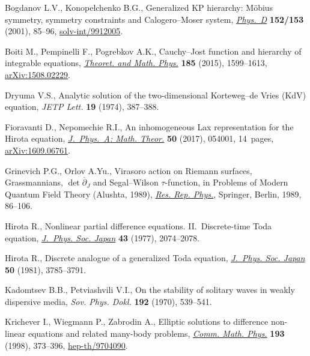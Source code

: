 \documentclass[pdftex]{sigma}
\numberwithin{equation}{section}
\begin{document}
\begin{thebibliography}{99}
\footnotesize\itemsep=-0.5pt

Bogdanov L.V., Konopelchenko B.G., Generalized {KP} hierarchy: {M}\"obius
 symmetry, symmetry constraints and {C}alogero--{M}oser system,
 \href{https://doi.org/10.1016/S0167-2789(01)00161-0}{\textit{Phys.~D}} \textbf{152/153} (2001), 85--96, \href{https://arxiv.org/abs/solv-int/9912005}{solv-int/9912005}.

Boiti M., Pempinelli F., Pogrebkov A.K., Cauchy--{J}ost function and hierarchy
 of integrable equations, \href{https://doi.org/10.1007/s11232-015-0367-y}{\textit{Theo\-ret. and Math. Phys.}} \textbf{185}
 (2015), 1599--1613, \href{https://arxiv.org/abs/1508.02229}{arXiv:1508.02229}.

Dryuma V.S., Analytic solution of the two-dimensional {K}orteweg--de {V}ries
 {(KdV)} equation, \textit{JETP Lett.} \textbf{19} (1974), 387--388.

Fioravanti D., Nepomechie R.I., An inhomogeneous {L}ax representation for the
 {H}irota equation, \href{https://doi.org/10.1088/1751-8121/aa5303}{\textit{J.~Phys.~A: Math. Theor.}} \textbf{50} (2017),
 054001, 14~pages, \href{https://arxiv.org/abs/1609.06761}{arXiv:1609.06761}.

Grinevich P.G., Orlov A.Yu., Virasoro action on {R}iemann surfaces,
 {G}rassmannians, {$\det \overline\partial_J$} and {S}egal--{W}ilson
 {$\tau$}-function, in Problems of Modern Quantum Field Theory ({A}lushta,
 1989), \href{https://doi.org/10.1007/978-3-642-84000-5_7}{\textit{Res. Rep. Phys.}}, Springer, Berlin, 1989, 86--106.

Hirota R., Nonlinear partial dif\/ference equations. {II}.~{D}iscrete-time {T}oda
 equation, \href{https://doi.org/10.1143/JPSJ.43.2074}{\textit{J.~Phys. Soc. Japan}} \textbf{43} (1977), 2074--2078.

Hirota R., Discrete analogue of a generalized {T}oda equation, \href{https://doi.org/10.1143/JPSJ.50.3785}{\textit{J.~Phys.
 Soc. Japan}} \textbf{50} (1981), 3785--3791.

Kadomtsev B.B., Petviashvili V.I., On the stability of solitary waves in weakly
 dispersive media, \textit{Sov. Phys. Dokl.} \textbf{192} (1970), 539--541.

Krichever I., Wiegmann P., Zabrodin A., Elliptic solutions to dif\/ference
 non-linear equations and related many-body problems, \href{https://doi.org/10.1007/s002200050333}{\textit{Comm. Math.
 Phys.}} \textbf{193} (1998), 373--396, \href{https://arxiv.org/abs/hep-th/9704090}{hep-th/9704090}.


\end{thebibliography}
\end{document}
